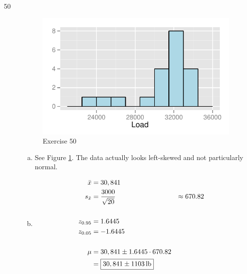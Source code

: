 \documentclass[letterpaper]{exam}
\begin{document}
\begin{description}
      \item[50]
        \begin{figure}[H]
          \centering
          \includegraphics{ex50.pdf}
          \caption{Exercise 50}
          \label{fig:ex50}
        \end{figure}

        \begin{enumerate}[(a)]
          \item See Figure \ref{fig:ex50}. The data actually looks left-skewed
            and not particularly normal.

          \item
            \begin{align*}
              \bar{x}     & = 30,841 \\
              s_{\bar{x}} & = \frac{3000}{\sqrt{20}}
                          & \approx 670.82 \\
              \\
              z_{0.95} & = 1.6445 \\
              z_{0.05} & = -1.6445 \\
              \\
              \mu & = 30,841 \pm 1.6445 \cdot 670.82 \\
                  & = \boxed{ \unit[30,841 \pm 1103]{lb} } \\
            \end{align*}
        \end{enumerate}


\end{description}
\end{document}
